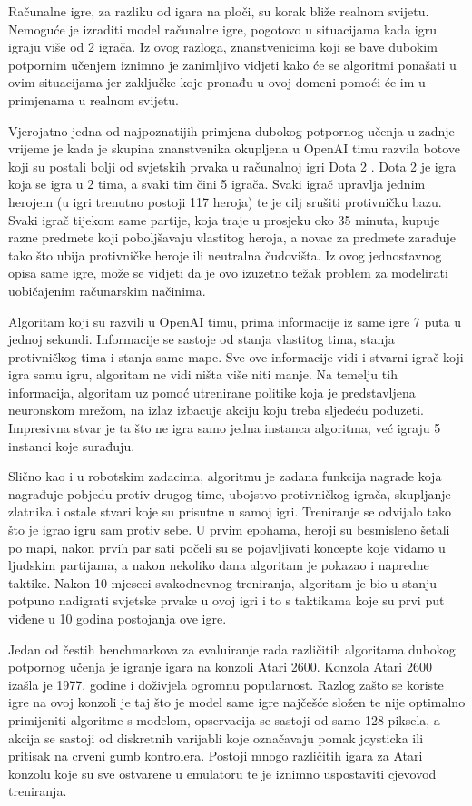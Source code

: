 \documentclass[times,utf8,diplomski]{fer}
\begin{document}
Računalne igre, za razliku od igara na ploči, su korak bliže realnom svijetu. Nemoguće je izraditi model računalne igre, pogotovo u situacijama kada igru igraju više od 2 igrača. Iz ovog razloga, znanstvenicima koji se bave dubokim potpornim učenjem iznimno je zanimljivo vidjeti kako će se algoritmi ponašati u ovim situacijama jer zaključke koje pronađu u ovoj domeni pomoći će im u primjenama u realnom svijetu.

Vjerojatno jedna od najpoznatijih primjena dubokog potpornog učenja u zadnje vrijeme je kada je skupina znanstvenika okupljena u OpenAI timu razvila botove koji su postali bolji od svjetskih prvaka u računalnoj igri Dota 2 \citep{openai2019dota}. Dota 2 je igra koja se igra u 2 tima, a svaki tim čini 5 igrača. Svaki igrač upravlja jednim herojem (u igri trenutno postoji 117 heroja) te je cilj srušiti protivničku bazu. Svaki igrač tijekom same partije, koja traje u prosjeku oko 35 minuta, kupuje razne predmete koji poboljšavaju vlastitog heroja, a novac za predmete zarađuje tako što ubija protivničke heroje ili neutralna čudovišta. Iz ovog jednostavnog opisa same igre, može se vidjeti da je ovo izuzetno težak problem za modelirati uobičajenim računarskim načinima.

Algoritam koji su razvili u OpenAI timu, prima informacije iz same igre 7 puta u jednoj sekundi. Informacije se sastoje od stanja vlastitog tima, stanja protivničkog tima i stanja same mape. Sve ove informacije vidi i stvarni igrač koji igra samu igru, algoritam ne vidi ništa više niti manje. Na temelju tih informacija, algoritam uz pomoć utrenirane politike koja je predstavljena neuronskom mrežom, na izlaz izbacuje akciju koju treba sljedeću poduzeti. Impresivna stvar je ta što ne igra samo jedna instanca algoritma, već igraju 5 instanci koje surađuju.

Slično kao i u robotskim zadacima, algoritmu je zadana funkcija nagrade koja nagrađuje pobjedu protiv drugog time, ubojstvo protivničkog igrača, skupljanje zlatnika i ostale stvari koje su prisutne u samoj igri. Treniranje se odvijalo tako što je igrao igru sam protiv sebe. U prvim epohama, heroji su besmisleno šetali po mapi, nakon prvih par sati počeli su se pojavljivati koncepte koje viđamo u ljudskim partijama, a nakon nekoliko dana algoritam je pokazao i napredne taktike. Nakon 10 mjeseci svakodnevnog treniranja, algoritam je bio u stanju potpuno nadigrati svjetske prvake u ovoj igri i to s taktikama koje su prvi put viđene u 10 godina postojanja ove igre.

Jedan od čestih benchmarkova za evaluiranje rada različitih algoritama dubokog potpornog učenja je igranje igara na konzoli Atari 2600. Konzola Atari 2600 izašla je 1977. godine i doživjela ogromnu popularnost. Razlog zašto se koriste igre na ovoj konzoli je taj što je model same igre najčešće složen te nije optimalno primijeniti algoritme s modelom, opservacija se sastoji od samo 128 piksela, a akcija se sastoji od diskretnih varijabli koje označavaju pomak joysticka ili pritisak na crveni gumb kontrolera. Postoji mnogo različitih igara za Atari konzolu koje su sve ostvarene u emulatoru te je iznimno uspostaviti cjevovod treniranja.
\end{document}
